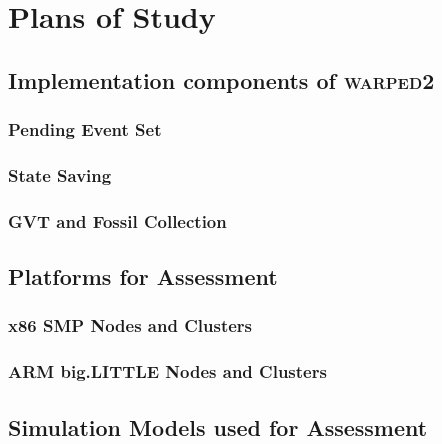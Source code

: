 \documentclass[11pt]{book}
\begin{document}

\chapter{Plans of Study}\label{plans_of_study}


\section{Implementation components of \textsc{warped2}}

\subsection{Pending Event Set}

\subsection{State Saving}

\subsection{GVT and Fossil Collection}



\section{Platforms for Assessment}

\subsection{x86 SMP Nodes and Clusters}


\subsection{ARM big.LITTLE Nodes and Clusters}

\section{Simulation Models used for Assessment}
\end{document}
